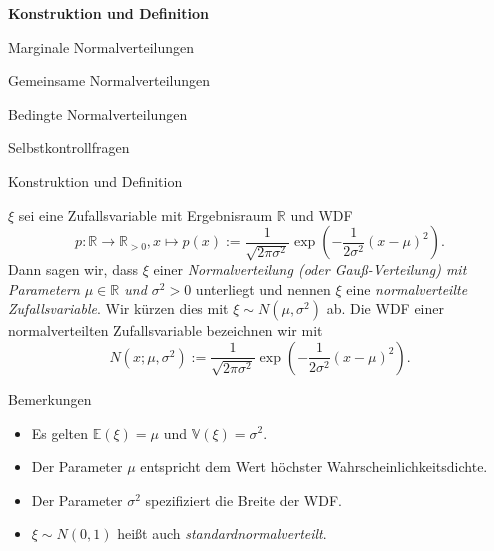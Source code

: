 \documentclass[
  8pt,
  ignorenonframetext,
]{beamer}
\providecommand{\tightlist}{%
  \setlength{\itemsep}{0pt}\setlength{\parskip}{0pt}}
\begin{document}
\begin{frame}{}
\protect\hypertarget{section-3}{}
\large
{}
\vfill

\textbf{Konstruktion und Definition}

Marginale Normalverteilungen

Gemeinsame Normalverteilungen

Bedingte Normalverteilungen

Selbstkontrollfragen \vfill
\end{frame}

\begin{frame}{Konstruktion und Definition}
\protect\hypertarget{konstruktion-und-definition}{}
\footnotesize
\begin{definition}
\justifying
$\xi$ sei eine Zufallsvariable mit Ergebnisraum $\mathbb{R}$ und WDF
\begin{equation}
p : \mathbb{R} \to \mathbb{R}_{>0}, x\mapsto p(x)
:= \frac{1}{\sqrt{2\pi \sigma^2}}\exp\left(-\frac{1}{2\sigma^2}(x - \mu)^2\right).
\end{equation}
Dann sagen wir, dass $\xi$ einer \textit{Normalverteilung (oder \textit{Gauß-Verteilung})
mit Parametern $\mu \in \mathbb{R}$ und $\sigma^2 > 0$} unterliegt und nennen $\xi$
eine \textit{normalverteilte Zufallsvariable}. Wir kürzen dies mit
$\xi \sim N(\mu,\sigma^2)$ ab. Die WDF einer normalverteilten
Zufallsvariable bezeichnen wir mit
\begin{equation}
N\left(x;\mu,\sigma^2\right) := \frac{1}{\sqrt{2\pi \sigma^2}}\exp\left(-\frac{1}{2\sigma^2}(x - \mu)^2\right).
\end{equation}
\end{definition}

Bemerkungen

\begin{itemize}
\tightlist
\item
  Es gelten \(\mathbb{E}(\xi) = \mu\) und
  \(\mathbb{V}(\xi) = \sigma^2\).
\item
  Der Parameter \(\mu\) entspricht dem Wert höchster
  Wahrscheinlichkeitsdichte.
\item
  Der Parameter \(\sigma^2\) spezifiziert die Breite der WDF.
\item
  \(\xi \sim N(0,1)\) heißt auch \emph{standardnormalverteilt}.
\end{itemize}
\end{frame}
\end{document}

